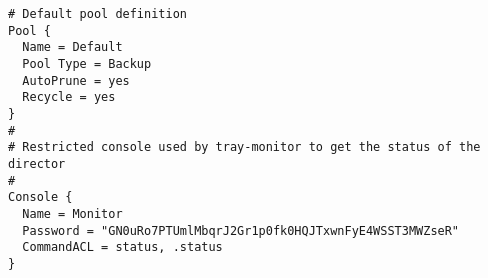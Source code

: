 \begin{verbatim}
# Default pool definition
Pool {
  Name = Default
  Pool Type = Backup
  AutoPrune = yes
  Recycle = yes
}
#
# Restricted console used by tray-monitor to get the status of the director
#
Console {
  Name = Monitor
  Password = "GN0uRo7PTUmlMbqrJ2Gr1p0fk0HQJTxwnFyE4WSST3MWZseR"
  CommandACL = status, .status
}
\end{verbatim}
\normalsize
